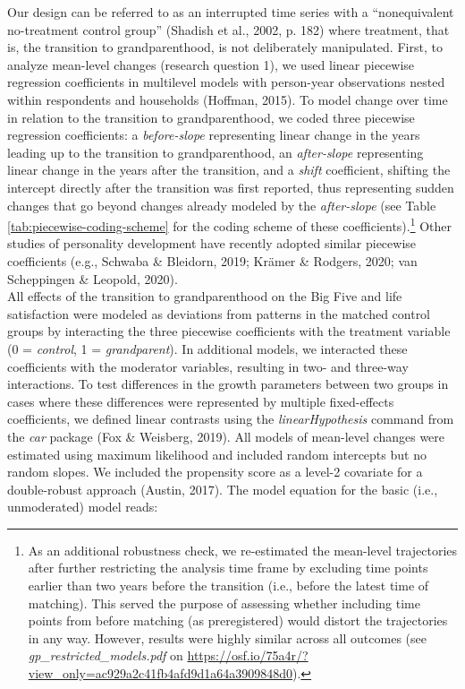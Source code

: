 \documentclass[
  english,
  man,floatsintext]{apa7}
\begin{document}
Our design can be referred to as an interrupted time series with a \enquote{nonequivalent no-treatment control group} (Shadish et al., 2002, p. 182) where treatment, that is, the transition to grandparenthood, is not deliberately manipulated. First, to analyze mean-level changes (research question 1), we used linear piecewise regression coefficients in multilevel models with person-year observations nested within respondents and households (Hoffman, 2015). To model change over time in relation to the transition to grandparenthood, we coded three piecewise regression coefficients: a \emph{before-slope} representing linear change in the years leading up to the transition to grandparenthood, an \emph{after-slope} representing linear change in the years after the transition, and a \emph{shift} coefficient, shifting the intercept directly after the transition was first reported, thus representing sudden changes that go beyond changes already modeled by the \emph{after-slope} (see Table \ref{tab:piecewise-coding-scheme} for the coding scheme of these coefficients).\footnote{As an additional robustness check, we re-estimated the mean-level trajectories after further restricting the analysis time frame by excluding time points earlier than two years before the transition (i.e., before the latest time of matching). This served the purpose of assessing whether including time points from before matching (as preregistered) would distort the trajectories in any way. However, results were highly similar across all outcomes (see \emph{gp\_restricted\_models.pdf} on \url{https://osf.io/75a4r/?view_only=ac929a2c41fb4afd9d1a64a3909848d0}).} Other studies of personality development have recently adopted similar piecewise coefficients (e.g., Schwaba \& Bleidorn, 2019; Krämer \& Rodgers, 2020; van Scheppingen \& Leopold, 2020).\\
All effects of the transition to grandparenthood on the Big Five and life satisfaction were modeled as deviations from patterns in the matched control groups by interacting the three piecewise coefficients with the treatment variable (0 = \emph{control}, 1 = \emph{grandparent}). In additional models, we interacted these coefficients with the moderator variables, resulting in two- and three-way interactions. To test differences in the growth parameters between two groups in cases where these differences were represented by multiple fixed-effects coefficients, we defined linear contrasts using the \emph{linearHypothesis} command from the \emph{car} package (Fox \& Weisberg, 2019). All models of mean-level changes were estimated using maximum likelihood and included random intercepts but no random slopes. We included the propensity score as a level-2 covariate for a double-robust approach (Austin, 2017). The model equation for the basic (i.e., unmoderated) model reads:
\end{document}
